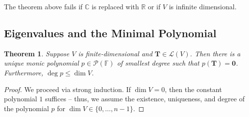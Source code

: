 \documentclass[11pt]{article}
\newcommand{\mat}[1]{\mathbf{#1}}
\newtheorem{theorem}{Theorem}
\begin{document}
The theorem above fails if $\mathbb{C}$ is replaced with $\mathbb{R}$ or if $V$ is infinite dimensional.


\subsection{Eigenvalues and the Minimal Polynomial}

\begin{theorem}
	Suppose $V$ is finite-dimensional and $\mat{T} \in \mathcal{L}(V)$. Then there is a unique monic polynomial $p \in \mathcal{P}(\mathbb{F})$ of smallest degree such that $p(\mat{T}) = \mat{0}$. Furthermore, $\deg p \le \dim V$.
\end{theorem}
\begin{adjustwidth}{1cm}{}
	\begin{proof}
		We proceed via strong induction. If $\dim V = 0$, then the constant polynomial $1$ suffices -- thus, we assume the existence, uniqueness, and degree of the polynomial $p$ for $\dim V \in \{ 0, \ldots, n - 1 \}$.


\end{proof}
\end{adjustwidth}
\end{document}
